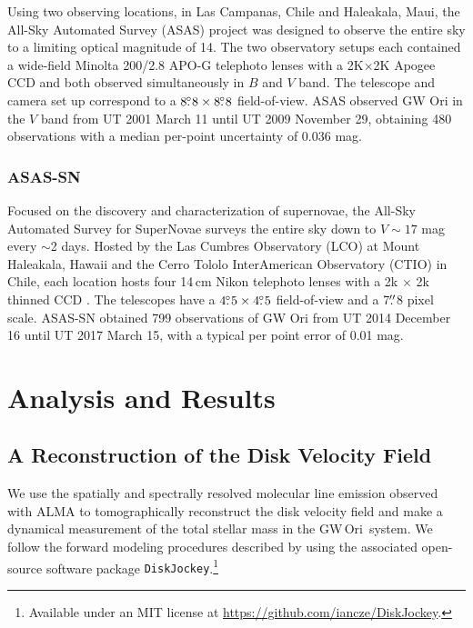 \documentclass[twocolumn]{aastex61}
\newcommand{\obj}{GW\,Ori}
\begin{document}
Using two observing locations, in Las Campanas, Chile and Haleakala, Maui, the All-Sky Automated Survey (ASAS) project was designed to observe the entire sky to a limiting optical magnitude of 14. The two observatory setups each contained a wide-field Minolta 200/2.8 APO-G telephoto lenses with a 2K$\times$2K Apogee CCD and both observed simultaneously in $B$ and $V$ band. The telescope and camera set up correspond to a $8\mbox{$.\!\!^\circ$}8\times8\mbox{$.\!\!^\circ$}8$ field-of-view. ASAS observed GW Ori in the $V$ band from UT 2001 March 11 until UT 2009 November 29, obtaining 480 observations with a median per-point uncertainty of 0.036 mag.


\subsubsection{ASAS-SN}

Focused on the discovery and characterization of supernovae, the All-Sky Automated Survey for SuperNovae \citep[ASAS-SN;][]{Shappee14, kochanek17} surveys the entire sky down to $V \sim 17$ mag every $\sim$2 days. Hosted by the Las Cumbres Observatory (LCO) at Mount Haleakala, Hawaii and the Cerro Tololo InterAmerican Observatory (CTIO) in Chile, each location hosts four 14\,cm Nikon telephoto lenses with a 2k $\times$ 2k thinned CCD \citep{Brown13}. The telescopes have a $4\mbox{$.\!\!^\circ$}5\times4\mbox{$.\!\!^\circ$}5$ field-of-view and a 7$\mbox{$.\!\!^{\prime\prime}$}$8 pixel scale. ASAS-SN obtained 799 observations of GW Ori from UT 2014 December 16 until UT 2017 March 15, with a typical per point error of 0.01 mag.




\section{Analysis and Results \label{sec:analysis}}




\subsection{A Reconstruction of the Disk Velocity Field \label{sec:disk}}

We use the spatially and spectrally resolved molecular line emission observed with ALMA to tomographically reconstruct the disk velocity field and make a dynamical measurement of the total stellar mass in the \obj\ system. We follow the forward modeling procedures described by \citet{czekala15a,czekala16} using the associated open-source software package {\tt DiskJockey}.\footnote{Available under an MIT license at \url{https://github.com/iancze/DiskJockey}.}
\end{document}
